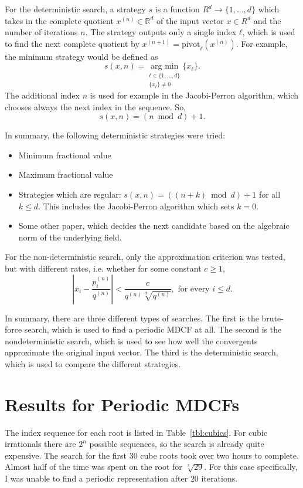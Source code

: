 For the deterministic search, a strategy $s$ is a function $R^d → \{1, …, d\}$
which takes in the complete quotient $x^{(n)} ∈ ℝ^d$ of the input vector $x ∈ R^d$
and the number of iterations $n$.
The strategy outputs only a single index $ℓ$,
which is used to find the next complete quotient by $x^{(n+1)} =
\mathrm{pivot}_ℓ(x^{(n)})$.
For example, the minimum strategy would be defined as
\[
  s(x, n) = \underset{\substack{ℓ ∈ \{1, …, d\} \\ \{x_ℓ\} ≠ 0}}{\text{arg min}} \{x_ℓ\}.
\]
The additional index $n$ is used for example in the Jacobi-Perron algorithm,
which chooses always the next index in the sequence.
So,
\[
  s(x, n) = (n \bmod d) + 1.
\]

In summary, the following deterministic strategies were tried:
\begin{itemize}
  \item Minimum fractional value
  \item Maximum fractional value
  \item Strategies which are regular: $s(x, n) = ((n + k) \bmod d) + 1$ for all $k ≤ d$.
    This includes the Jacobi-Perron algorithm which sets $k = 0$.
  \item Some other paper, which decides the next candidate
    based on the algebraic norm of the underlying field. %
\end{itemize}

For the non-deterministic search, only the approximation criterion was tested,
but with different rates, i.e. whether for some constant $c ≥ 1$,
\[
  \left|x_i - \frac{p_i^{(n)}}{q^{(n)}}\right| < \frac{c}{q^{(n)} \sqrt[d]{q^{(n)}}}, \text{ for every } i ≤ d.
\]

In summary,
there are three different types of searches.
The first is the brute-force search, which is used to find a periodic MDCF at all.
The second is the nondeterministic search, which is used to see how well the
convergents approximate the original input vector.
The third is the deterministic search, which is used to compare the different
strategies.

\section{Results for Periodic MDCFs}

The index sequence for each root is listed in Table~\ref{tbl:cubics}.
For cubic irrationals there are $2^n$ possible sequences,
so the search is already quite expensive.
The search for the first 30 cube roots took over two hours to complete.
Almost half of the time was spent on the root for $\sqrt[3]{29}$.
For this case specifically, I was unable to find a periodic representation
after $20$ iterations. %

